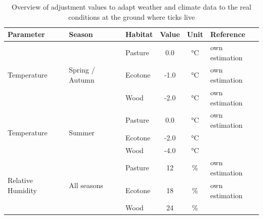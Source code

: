 \documentclass[a4paper, 11pt]{scrartcl}
\begin{document}
\begin{table}[h!]
\caption[Overview of microclimatic adjustment values]{Overview of adjustment values to adapt weather and climate data to the real conditions at the ground where ticks live}
\label{tab:micro_climate_adjustments}
\begin{tabularx}{\textwidth}{lllccl}
\toprule
\textbf{Parameter}					& \textbf{Season} 					& \textbf{Habitat}  & \textbf{Value}  & \textbf{Unit} & \textbf{Reference} \\
\midrule
\multirow{3}{*}{Temperature} 		& \multirow{3}{*}{Spring / Autumn}  & Pasture 			&   0.0   		& °C & own estimation \\
									&									& Ecotone 			&   -1.0 	  	& °C & own estimation \\
									&					 				& Wood    			&   -2.0   		& °C & own estimation \\
\midrule
\multirow{3}{*}{Temperature} 		& \multirow{3}{*}{Summer}        	& Pasture 			&   0.0    		& °C & own estimation \\
									&				 	 				& Ecotone 			&  -2.0    		& °C & \textcite{Geiger.1995} \\
									&				 	 				& Wood	   			&  -4.0    		& °C & \textcite{Bonan.2016} \\
\midrule
\multirow{3}{*}{Relative Humidity}  & \multirow{3}{*}{All seasons}      & Pasture 			&   12   		& \% & own estimation \\
									&				 					& Ecotone 			&   18    		& \% & own estimation \\
									&				 					& Wood    			&   24    		& \% & \textcite{Boehnke.2017} \\
\bottomrule
\end{tabularx}
\end{table}


\newpage
\printbibliography[heading = bibintoc, title = {Bibliography}]
\end{document}
